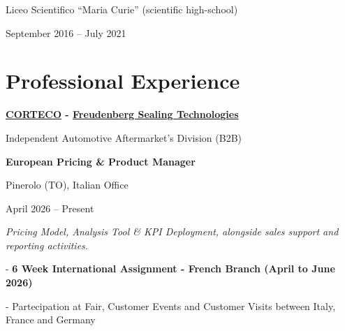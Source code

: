 \documentclass[10pt,a4paper]{article}
\begin{document}
\par
Liceo Scientifico “Maria Curie” (scientific high-school)

\par
September 2016 -- July 2021

\vspace{12pt}


\section*{Professional Experience}

\vspace{8pt}

\textbf{\href{https://www.corteco.com/}{CORTECO}
-
\href{https://www.freudenberg.com/en}{Freudenberg Sealing Technologies}
}

\par
Independent Automotive Aftermarket's Division (B2B)

\vspace{2pt}


\textbf{European Pricing \& Product Manager}

\par
Pinerolo (TO), Italian Office

\par
April 2026 -- Present

\vspace{1pt}

{\small
\textit{
Pricing Model, Analysis Tool \& KPI Deployment,
alongside sales support and reporting activities.
}
}

\vspace{2pt}

{\small
-
\textbf{
6 Week International Assignment -
French Branch (April to June 2026)
}
}
\par
{\small
-
{
Partecipation at Fair, Customer Events and Customer Visits between Italy, France and Germany
}
}

\vspace{3pt}

\end{document}
